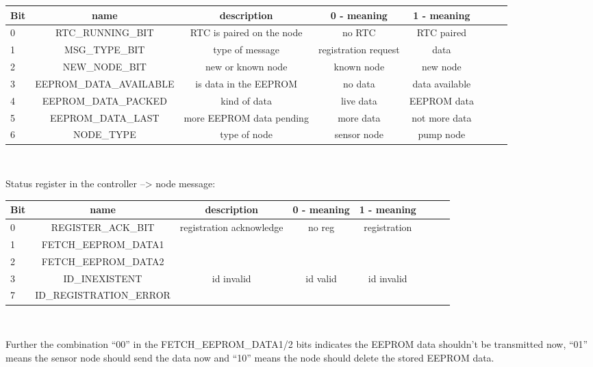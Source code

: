 \begin{table}[htbp]
        \small
        \setlength\tabcolsep{2pt}
\begin{tabular}{ |l|c|c|c|c|c|c|r| }
\hline
  Bit & name & description & 0 - meaning & 1 - meaning\\ \hline
  0 & RTC\_RUNNING\_BIT & RTC is paired on the node & no RTC & RTC paired \\ \hline
  1 & MSG\_TYPE\_BIT & type of message & registration request & data \\ \hline
  2 & NEW\_NODE\_BIT & new or known node & known node & new node \\ \hline
  3 & EEPROM\_DATA\_AVAILABLE & is data in the EEPROM & no data & data available\\ \hline
  4 & EEPROM\_DATA\_PACKED & kind of data & live data & EEPROM data\\ \hline
  5 & EEPROM\_DATA\_LAST & more EEPROM data pending & more data & not more data \\ \hline
  6 & NODE\_TYPE & type of node & sensor node & pump node\\ \hline
\end{tabular}\\
\end{table}


Status register in the controller --> node message:


\begin{table}[htbp]
        \small
        \setlength\tabcolsep{2pt}
\begin{tabular}{ |l|c|c|c|c|c|c|r| }
\hline
  Bit & name & description & 0 - meaning & 1 - meaning\\ \hline
  0 & REGISTER\_ACK\_BIT & registration acknowledge & no reg & registration\\ \hline
  1 & FETCH\_EEPROM\_DATA1 & &  &  \\ \hline
  2 & FETCH\_EEPROM\_DATA2 &  & &  \\ \hline
  3 & ID\_INEXISTENT & id invalid & id valid & id invalid\\ \hline
  7 & ID\_REGISTRATION\_ERROR &  & &  \\ \hline
\end{tabular}\\
\end{table}

Further the combination ``00'' in the FETCH\_EEPROM\_DATA1/2 bits indicates the EEPROM data shouldn't be transmitted now, ``01'' means the sensor node should send the data now and ``10'' means the node should delete the stored EEPROM data.
